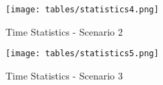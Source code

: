 \begin{table}[H]
  \texttt{[image: tables/statistics4.png]}
  \caption{Time Statistics - Scenario 2}
  \label{tbl:statistics4}
\end{table}

\begin{table}[H]
  \texttt{[image: tables/statistics5.png]}
  \caption{Time Statistics - Scenario 3}
  \label{tbl:statistics5}
\end{table}	


